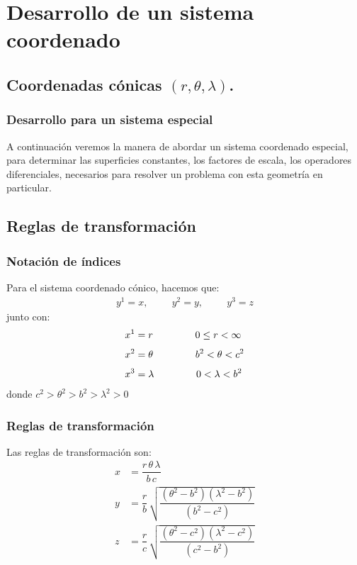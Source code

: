 \documentclass[12pt]{beamer}
\begin{document}
\section{Desarrollo de un sistema coordenado}
\subsection{Coordenadas cónicas \texorpdfstring{$(r, \theta, \lambda)$}{(r, t, l)}.}

\begin{frame}
\frametitle{Desarrollo para un sistema especial}
A continuación veremos la manera de abordar un sistema coordenado especial, para determinar las superficies constantes, los factores de escala, los operadores diferenciales, necesarios para resolver un problema con esta geometría en particular.
\end{frame}

\subsection{Reglas de transformación}
\begin{frame}
\frametitle{Notación de índices}
Para el sistema coordenado cónico, hacemos que:
\pause
\begin{align*}
y^{1} = x, \hspace{1cm} y^{2} = y, \hspace{1cm} y^{3} = z
\end{align*}
\pause
junto con:
\begin{align*}
x^{1} &= r \hspace{1.5cm} 0 \leq r < \infty \\[0.35em]
x^{2} &= \theta \hspace{1.5cm} b^{2} < \theta < c^{2} \\[0.35em]
x^{3} &= \lambda \hspace{1.5cm} 0 < \lambda < b^{2}
\end{align*}
donde $c^{2} > \theta^{2} > b^{2} > \lambda^{2} > 0$
\end{frame}
\begin{frame}
\frametitle{Reglas de transformación}
Las reglas de transformación son:
\pause
\begin{align*}
x &= \dfrac{r \, \theta \, \lambda}{b \, c} \\[0.5em]
y &= \dfrac{r}{b} \, \sqrt{\dfrac{(\theta^{2} - b^{2})(\lambda^{2} - b^{2})}{(b^{2} - c^{2})}} \\[0.5em]
z &= \dfrac{r}{c} \, \sqrt{\dfrac{(\theta^{2} - c^{2})(\lambda^{2} - c^{2})}{(c^{2} - b^{2})}}
\end{align*}
\end{frame}
\end{document}
